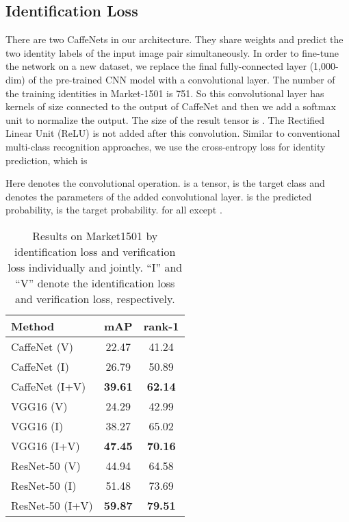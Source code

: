 \documentclass[journal]{IEEEtran}
\begin{document}
\subsection{Identification Loss}
There are two CaffeNets in our architecture. They share weights and predict the two identity labels of the input image pair simultaneously. In order to fine-tune the network on a new dataset, we replace the final fully-connected layer (1,000-dim) of the pre-trained CNN model with a  convolutional layer. The number of the training identities in Market-1501 is 751. So this convolutional layer has  kernels of size  connected to the output  of CaffeNet and then we add a softmax unit to normalize the output. The size of the result tensor is . The Rectified Linear Unit (ReLU) is not added after this convolution. Similar to conventional multi-class recognition approaches, we use the cross-entropy loss for identity prediction, which is 

Here  denotes the convolutional operation.  is a  tensor,  is the target class and  denotes the parameters of the added convolutional layer.  is the predicted probability, 
 is the target probability.  for all  except . 

\setlength{\tabcolsep}{15pt}
\begin{table}
\begin{center}
\begin{tabular}{l|cc}
\hline
Method & mAP & rank-1\\
\hline
CaffeNet (V) & 22.47 & 41.24 \\
CaffeNet (I) & 26.79 & 50.89 \\
CaffeNet (I+V) & \textbf{39.61} & \textbf{62.14} \\
\hline
VGG16 (V) & 24.29 & 42.99 \\
VGG16 (I) & 38.27 & 65.02 \\
VGG16 (I+V) & \textbf{47.45} & \textbf{70.16} \\
\hline
ResNet-50 (V) & 44.94 & 64.58 \\
ResNet-50 (I) & 51.48 & 73.69 \\
ResNet-50 (I+V) & \textbf{59.87} & \textbf{79.51} \\
\hline
\end{tabular}
\end{center}
\caption{Results on Market1501 \cite{zheng2015scalable} by identification loss and verification loss individually and jointly. ``I'' and ``V'' denote the identification loss and verification loss, respectively.}
\label{table:vs}
\end{table}
\end{document}
